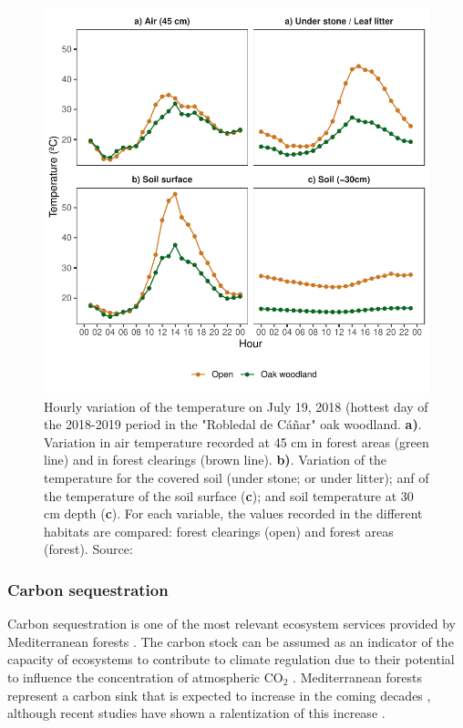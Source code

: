 \begin{figure}[H]
    \centering
    \includegraphics[width=\textwidth]{img/es/es-profiletemp.pdf}\caption{Hourly variation of the temperature on July 19, 2018 (hottest day of the 2018-2019 period in the "Robledal de Cáñar" oak woodland. \textbf{a)}. Variation in air temperature recorded at 45 cm in forest areas (green line) and in forest clearings (brown line). \textbf{b)}. Variation of the temperature for the covered soil (under stone; or under litter); anf of the temperature of the soil surface (\textbf{c}); and soil temperature at 30 cm depth (\textbf{c}). For each variable, the values recorded in the different habitats are compared: forest clearings (open) and forest areas (forest). Source: \autocite{Zamoraetal2021UniendoMacro}}\label{fig:es:temp}
\end{figure}

\subsubsection{Carbon sequestration}\label{sec:es:regulation-carbon}
Carbon sequestration is one of the most relevant ecosystem services provided by Mediterranean forests \autocites{Gauquelinetal2018MediterraneanForests,NoceSantini2018MediterraneanForest}. The carbon stock can be assumed as an indicator of the capacity of ecosystems to contribute to climate regulation due to their potential to influence the concentration of atmospheric CO$_2$ \autocites{Lauterbach2007AssessmentExisting,Luyssaertetal2008OldgrowthForests}. Mediterranean forests represent a carbon sink that is expected to increase in the coming decades \autocites{Canellasetal2017CarbonSequestration,PasalodosTatoetal2017EvaluationTree}, although recent studies have shown a ralentization of this increase \autocites[][]{RocesDiazetal2021TemporalChanges}.

